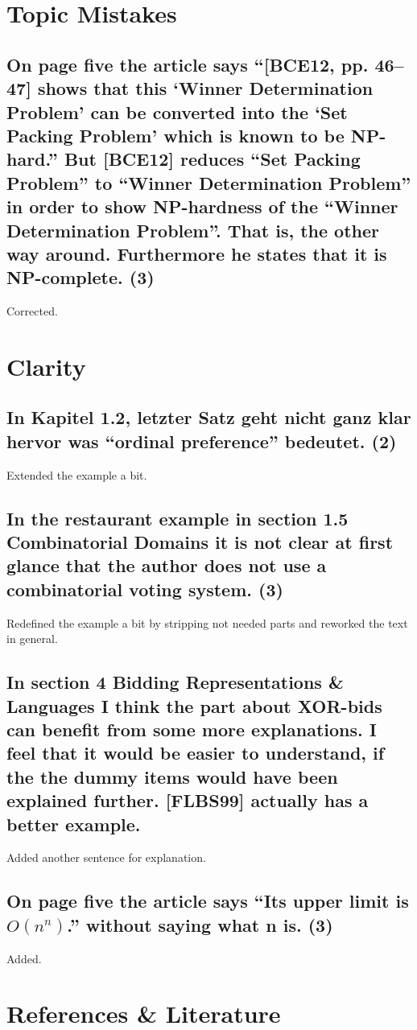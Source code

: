 \documentclass{"../../Datenanalyse/assignments/latex-brookesassignment/brookes-assignment"}
\begin{document}
\section{Topic Mistakes}
\subsection{On page five the article says ``[BCE12, pp. 46–47] shows that this `Winner Determination Problem' can be converted into the `Set Packing Problem' which is known to be NP-hard.'' But [BCE12] reduces ``Set Packing Problem'' to ``Winner Determination Problem'' in order to show NP-hardness of the ``Winner Determination Problem''. That is, the other way around. Furthermore he states that it is NP-complete. (3)}
Corrected.

\section{Clarity}
\subsection{In Kapitel 1.2, letzter Satz geht nicht ganz klar hervor was ``ordinal preference'' bedeutet. (2)}
Extended the example a bit.
\subsection{In the restaurant example in section 1.5 Combinatorial Domains it is not clear at first glance that the author does not use a combinatorial voting system. (3)}
Redefined the example a bit by stripping not needed parts and reworked the text in general.
\subsection{In section 4 Bidding Representations \& Languages I think the part about XOR-bids can benefit from some more explanations. I feel that it would be easier to understand, if the the dummy items would have been explained further. [FLBS99] actually has a better example.}
Added another sentence for explanation.
\subsection{On page five the article says ``Its upper limit is $O(n^n)$.'' without saying what n is. (3)}
Added.

\section{References \& Literature}
\end{document}
